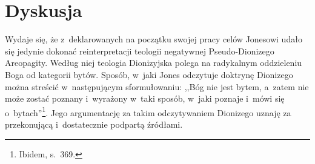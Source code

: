 \section{Dyskusja}

Wydaje się, że z~deklarowanych na początku swojej pracy celów Jonesowi udało się jedynie dokonać reinterpretacji teologii negatywnej Pseudo-Dionizego Areopagity. Według niej teologia Dionizyjska polega na radykalnym oddzieleniu Boga od kategorii bytów. Sposób, w~jaki Jones odczytuje doktrynę Dionizego można streścić w~następującym sformułowaniu: ,,Bóg nie jest bytem, a~zatem nie może zostać poznany i~wyrażony w~taki sposób, w~jaki poznaje i~mówi się o~bytach''\footnote{Ibidem, s.~369.}. Jego argumentację za takim odczytywaniem Dionizego uznaję za przekonującą i~dostatecznie podpartą źródłami.

